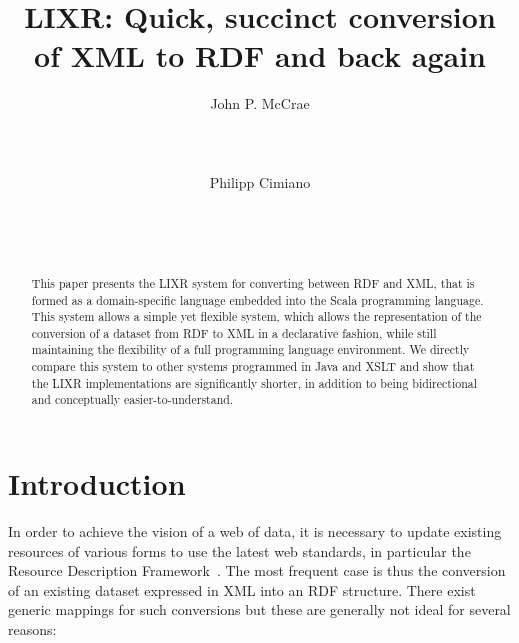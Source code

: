 \documentclass{acm_proc_article-sp}
\begin{document}
\title{LIXR: Quick, succinct conversion of XML to RDF and back again}


\author{
\alignauthor
John P. McCrae\\
       \\
       \\
       \\
\alignauthor
Philipp Cimiano\\
       \\
       \\
       \\
}

\maketitle
\begin{abstract}
This paper presents the LIXR system for converting between RDF and XML, that is
formed as a domain-specific language embedded into the Scala programming language.
This system allows a simple yet flexible system, which allows
the representation of the conversion
of a dataset from RDF to XML in a declarative fashion, while still maintaining the flexibility of a full
programming language environment. We directly compare this system to other systems
programmed in Java and XSLT and show that the LIXR implementations are significantly
shorter, in addition to being bidirectional and conceptually easier-to-understand.

\end{abstract}




\section{Introduction}

In order to achieve the vision of a web of data, it is necessary to update existing 
resources of various forms to use the latest web standards, in particular the 
Resource Description Framework~\cite[RDF]{cyganiak2014rdf}. The most frequent case is thus the
conversion of an existing dataset expressed in XML into an RDF structure. There
exist generic mappings for such conversions but these are generally not ideal for
several reasons:
\end{document}
